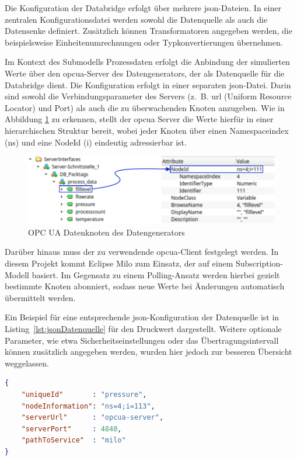 Die Konfiguration der Databridge erfolgt über mehrere \acs{json}-Dateien.
In einer zentralen Konfigurationsdatei werden sowohl die Datenquelle als auch die Datensenke definiert.
Zusätzlich können Transformatoren angegeben werden, die beispielsweise Einheitenumrechnungen oder Typkonvertierungen übernehmen.

Im Kontext des Submodells Prozessdaten erfolgt die Anbindung der simulierten Werte über den \acs{opcua}-Server des Datengenerators, der als Datenquelle für die Databridge dient.
Die Konfiguration erfolgt in einer separaten \acs{json}-Datei.
Darin sind sowohl die Verbindungsparameter des Servers (z.~B. \acs{url} (Uniform Resource Locator) und Port) als auch die zu überwachenden Knoten anzugeben.
Wie in Abbildung \ref{fig:OPCUADatenStruktur} zu erkennen, stellt der \acs{opcua} Server die Werte hierfür in einer hierarchischen Struktur bereit, wobei jeder Knoten über einen Namespaceindex (ns) und eine NodeId (i) eindeutig adressierbar ist.

\newpage
\begin{figure}[htbp]
    \centering
    \includegraphics{Bilder/OPCUA/OPCUADaten.pdf}
    \caption[OPC UA Datenknoten des Datengenerators]{OPC UA Datenknoten des Datengenerators}
    \label{fig:OPCUADatenStruktur}
\end{figure}

Darüber hinaus muss der zu verwendende \acs{opcua}-Client festgelegt werden.
In diesem Projekt kommt Eclipse Milo zum Einsatz, der auf einem Subscription-Modell basiert.
Im Gegensatz zu einem Polling-Ansatz werden hierbei gezielt bestimmte Knoten abonniert, sodass neue Werte bei Änderungen automatisch übermittelt werden.

Ein Beispiel für eine entsprechende \acs{json}-Konfiguration der Datenquelle ist in Listing~\ref{lst:jsonDatenquelle} für den Druckwert dargestellt.
Weitere optionale Parameter, wie etwa Sicherheitseinstellungen oder das Übertragungsintervall können zusätzlich angegeben werden, wurden hier jedoch zur besseren Übersicht weggelassen.

\begin{lstlisting}[language=json, caption={Beispielhafte \acs{json}-Konfiguration einer Datenquelle}, label={lst:jsonDatenquelle}]
{
    "uniqueId"       : "pressure",
    "nodeInformation": "ns=4;i=113",
    "serverUrl"      : "opcua-server",
    "serverPort"     : 4840,
    "pathToService"  : "milo"
}
\end{lstlisting}


